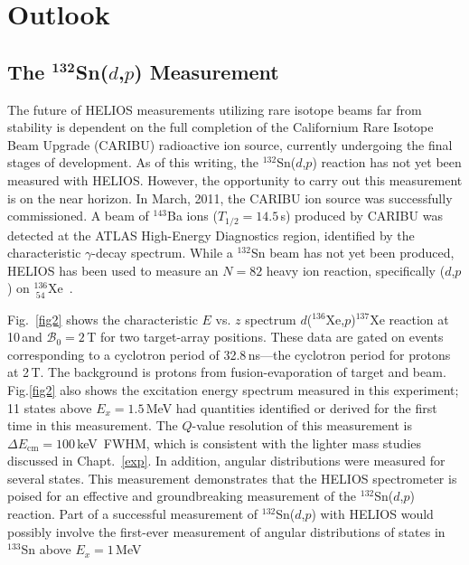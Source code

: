 \section{Outlook}
\subsection[\texorpdfstring{The $^\text{132}$S\lowercase{n($d$,$p$)} Measurement}{The 132Sn(d,p) Measurement}]{\texorpdfstring{The $^\mathbf{132}$Sn($d$,$p$) Measurement}{The 132Sn(d,p) Measurement}}
The future of HELIOS measurements utilizing rare isotope beams far from stability is dependent on the full completion of the Californium Rare Isotope Beam Upgrade (CARIBU) radioactive ion source, currently  undergoing the final stages of development.
As of this writing, the $^{132}$Sn($d$,$p$) reaction has not yet been measured with HELIOS.  However, the opportunity to carry out this measurement is on the near horizon. 
 In March, 2011, the CARIBU ion source was successfully commissioned.  A beam of $^{143}$Ba ions ($T_{1/2}=14.5$\,s) produced by CARIBU was detected at the ATLAS High-Energy Diagnostics region, %
  identified by the characteristic $\gamma$-decay spectrum.  While a $^{132}$Sn beam has not yet been produced, HELIOS has been used to measure an $N=82$ heavy ion reaction, specifically ($d$,$p$) on $^{136}_{~54}$Xe~\cite{Kay_2011}.  

Fig.~\ref{fig2} shows the characteristic $E$ vs. $z$ spectrum $d$($^{136}$Xe,$p$)$^{137}$Xe reaction at 10\,\AMeV and $\mathscr{B}_0=2$\,T for two target-array positions.  These data are gated on events corresponding to a cyclotron period of 32.8\,ns---the cyclotron period for protons at 2\,T. The background is protons from fusion-evaporation of target and beam.  Fig.\ref{fig2} also shows the excitation energy spectrum measured in this experiment; 11 states above $E_x=1.5$\,MeV had quantities identified or derived for the first time in this measurement.  The $Q$-value resolution of this measurement is $\Delta E_\mathrm{cm}=100$\,keV~FWHM, which is consistent with the lighter mass studies discussed in Chapt.~\ref{exp}. 
In addition, angular distributions were measured for several states.  This measurement demonstrates that the HELIOS spectrometer is poised for an effective and groundbreaking measurement of the $^{132}$Sn($d$,$p$) reaction.  Part of a successful measurement of $^{132}$Sn($d$,$p$) with HELIOS would possibly involve the first-ever measurement of angular distributions of states in $^{133}$Sn above $E_x=1$\,MeV

